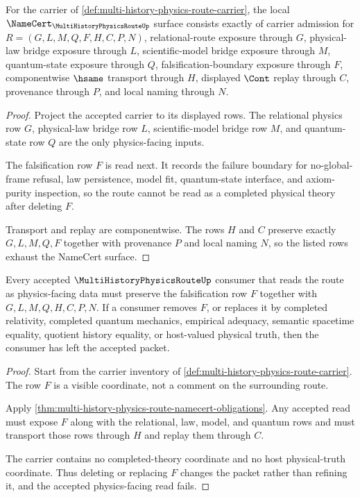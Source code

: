 \begin{theorem}
\label{thm:multi-history-physics-route-namecert-obligations}
For the carrier of \autoref{def:multi-history-physics-route-carrier}, the local $\NameCert_{\MultiHistoryPhysicsRouteUp}$ surface consists exactly of carrier admission for $R=(G,L,M,Q,F,H,C,P,N)$, relational-route exposure through $G$, physical-law bridge exposure through $L$, scientific-model bridge exposure through $M$, quantum-state exposure through $Q$, falsification-boundary exposure through $F$, componentwise $\hsame$ transport through $H$, displayed $\Cont$ replay through $C$, provenance through $P$, and local naming through $N$.
\end{theorem}
\begin{proof}
Project the accepted carrier to its displayed rows. The relational physics row $G$, physical-law bridge row $L$, scientific-model bridge row $M$, and quantum-state row $Q$ are the only physics-facing inputs.

The falsification row $F$ is read next. It records the failure boundary for no-global-frame refusal, law persistence, model fit, quantum-state interface, and axiom-purity inspection, so the route cannot be read as a completed physical theory after deleting $F$.

Transport and replay are componentwise. The rows $H$ and $C$ preserve exactly $G,L,M,Q,F$ together with provenance $P$ and local naming $N$, so the listed rows exhaust the NameCert surface.
\end{proof}

\begin{theorem}
\label{thm:multi-history-physics-route-falsification-surface}
Every accepted $\MultiHistoryPhysicsRouteUp$ consumer that reads the route as physics-facing data must preserve the falsification row $F$ together with $G,L,M,Q,H,C,P,N$. If a consumer removes $F$, or replaces it by completed relativity, completed quantum mechanics, empirical adequacy, semantic spacetime equality, quotient history equality, or host-valued physical truth, then the consumer has left the accepted packet.
\end{theorem}
\begin{proof}
Start from the carrier inventory of \autoref{def:multi-history-physics-route-carrier}. The row $F$ is a visible coordinate, not a comment on the surrounding route.

Apply \autoref{thm:multi-history-physics-route-namecert-obligations}. Any accepted read must expose $F$ along with the relational, law, model, and quantum rows and must transport those rows through $H$ and replay them through $C$.

The carrier contains no completed-theory coordinate and no host physical-truth coordinate. Thus deleting or replacing $F$ changes the packet rather than refining it, and the accepted physics-facing read fails.
\end{proof}

